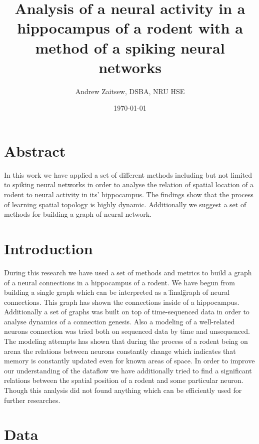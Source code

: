 \documentclass{article}
\title{Analysis of a neural activity in a hippocampus of a rodent with a method of a spiking neural networks}
\author{Andrew Zaitsew, DSBA, NRU HSE}
\date{\today}
\begin{document}
	\newcommand{\img}[2]{
		\begin{figure}[ht!]
			\centering
			\texttt{[image: \#1]}
			\caption{#2}
		\end{figure}
	}
	\maketitle
	\section{Abstract}\label{sec:abstract}
	In this work we have applied a set of different methods including but not limited to spiking neural networks
	in order to analyse the relation of spatial location of a rodent to neural activity in its' hippocampus.
	The findings show that the process of learning spatial topology is highly dynamic. Additionally we suggest a set
	of methods for building a graph of neural network.
	\section{Introduction}\label{sec:intorduction}

	During this research we have used a set of methods and metrics to build a graph of a neural connections in
	a hippocampus of a rodent. We have begun from building a single graph which can be interpreted as a \"final\" graph
	of neural connections. This graph has shown the connections inside of a hippocampus. Additionally a set of graphs
	was built on top of time-sequenced data in order to analyse dynamics of a connection genesis.
	Also a modeling of a well-related neurons connection was tried both on sequenced data by time and unsequenced. The
	modeling attempts has shown that during the process of a rodent being on arena the relations between neurons constantly
	change which indicates that memory is constantly updated even for known areas of space. %
	In order to improve our understanding of the dataflow we have additionally tried to find a significant relations between
	the spatial position of a rodent and some particular neuron. Though this analysis did not found anything which can
	be efficiently used for further researches. %
	\section{Data}\label{sec:data}
\end{document}
